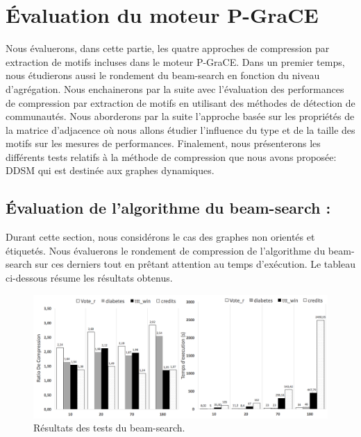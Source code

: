 	\section{Évaluation du moteur P-GraCE}
	
	Nous évaluerons, dans cette partie, les quatre approches de compression par extraction de motifs incluses dans le moteur P-GraCE. 
	Dans un premier temps, nous étudierons aussi le rondement du beam-search en fonction du niveau d'agrégation.  Nous enchainerons par la suite avec l'évaluation des performances de compression par extraction de motifs en utilisant des méthodes de détection de communautés. Nous aborderons par la suite l'approche basée sur les propriétés de la matrice d'adjacence où nous allons étudier l'influence du type et de la taille des motifs sur les mesures de performances.
	Finalement, nous présenterons les différents tests relatifs à la méthode de compression que nous avons proposée: DDSM qui est destinée aux graphes dynamiques.
	\subsection{Évaluation de l'algorithme du beam-search :}
	
  Durant cette section, nous considérons le cas des graphes non orientés et étiquetés. Nous évaluerons le rondement de compression de l'algorithme du beam-search sur ces derniers tout en prêtant attention au temps d'exécution. Le tableau ci-dessous résume les résultats obtenus.
  

	\begin{figure}[H]
	
			
			\includegraphics[scale=0.37]{ressources/image/beam.png}
			
			\caption{Résultats des tests du beam-search.}
			\label{fig:test-beam}
	
	\end{figure}
	
	
